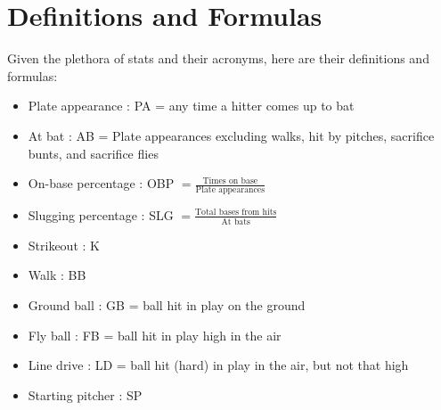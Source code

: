 \documentclass[12pt,onecolumn]{article}
\begin{document}
\section*{Definitions and Formulas}
Given the plethora of stats and their acronyms, here are their definitions and formulas:
\begin{itemize}
\item Plate appearance : PA = any time a hitter comes up to bat
\item At bat : AB = Plate appearances excluding walks, hit by pitches, sacrifice bunts, and sacrifice flies
\item On-base percentage : OBP $=\displaystyle \frac{\text{Times on base}}{\text{Plate appearances}}$
\item Slugging percentage : SLG $=\displaystyle \frac{\text{Total bases from hits}}{\text{At bats}}$
\item Strikeout : K
\item Walk : BB
\item Ground ball : GB = ball hit in play on the ground
\item Fly ball : FB = ball hit in play high in the air
\item Line drive : LD = ball hit (hard) in play in the air, but not that high
\item Starting pitcher : SP
\end{itemize}
\end{document}
